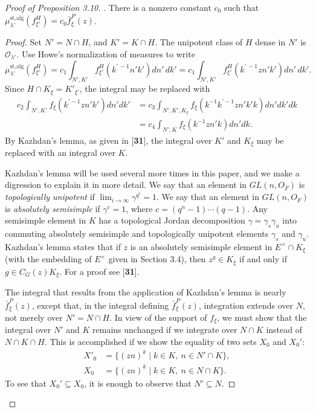 \documentclass{amsart}
\begin{document}
\begin{proof}[Proof of Proposition 3.10]
.  There is a nonzero constant $c_0$ such that
$\mu_{\lambda'}^{\text{st,alg}}(f^H_{\xi'}) = c_0 \bar f_\xi^P(z)$.
\finishproclaim

\begin{proof}  Set $N'=N\cap H$, and $K'=K\cap H$.  The unipotent
class of $H$ dense in $N'$ is ${\mathcal O}_{\lambda'}$.
Use Howe's normalization
of measures to write 
$$
\mu^{\text{st,alg}}_{\lambda'}(f^H_{\xi'}) = c_1\int_{N',K'} 
	f_{\xi'}^H (k^{\prime\, -1}n'k')dn'\,dk' = c_1\int_{N',K'}
	f_{\xi'}^H (k^{\prime\,-1}zn'k')dn'\,dk'.$$
%
Since $H\cap K_\xi=K'_{\xi'}$, the integral may be replaced with
\begin{align*}
c_2\int_{N',K'}f_\xi(k^{\prime-1}zn'k')dn'dk' &=
 c_3\int_{N',K',K_\xi} f_\xi(k^{-1}k^{\prime-1}zn'k'k) dn'dk'dk\\&=
 c_4\int_{N',K} f_\xi(k^{-1}zn'k)dn'dk.
\end{align*}
By Kazhdan's lemma, as given in [{\bf 31}], 
the integral over $K'$ and $K_\xi$ may be replaced  with
an integral over $K$.  

Kazhdan's lemma will be used several more times in this paper, and
we make a digression to explain it in more detail.
We say that an element in $GL(n,O_F)$ is {\it topologically unipotent} if
$\lim_{i\to\infty}\gamma^{q^i} = 1$.  We say that an element in $GL(n,O_F)$
is {\it absolutely semisimple} if $\gamma^c=1$, where $c = (q^n-1)\cdots (q-1)$.
Any semisimple element in $K$ has a topological Jordan decomposition
$\gamma=\gamma_s\gamma_u$ into commuting absolutely semisimple and topologically
unipotent elements $\gamma_s$ and $\gamma_u$.  Kazhdan's lemma states
that if $z$ is an absolutely semisimple element in $E^\times\cap K_\xi$
(with the embedding of $E^\times$ given in Section 3.4), then $z^g\in K_\xi$
if and only if $g\in C_G(z)K_\xi$.  For a proof see [{\bf 31}].

The integral that results from the application of Kazhdan's lemma is nearly $\bar f_\xi^P(z)$,
except that, in the integral defining $\bar f_\xi^P(z)$, integration
extends over $N$, not merely over $N'=N\cap H$.  In view of the support
of $f_\xi$, we must show that the integral over $N'$ and $K$ remains unchanged
if we integrate over $N\cap K$ instead of $N\cap K\cap H$.  This
is accomplished if we show the equality of two sets $X_0$ and $X_0'$:
\begin{align*}
   	X'_0 &= \{(zn)^k \mid k\in K,\ n\in N'\cap K\},\\
	X_0 &= \{ (zn)^k \mid k\in K, \ n\in N\cap K\}.
\end{align*}
%
To see that $X_0'\subseteq X_0$, it is enough to observe that
$N'\subseteq N$.  


\end{proof}
\end{proof}
\end{document}
